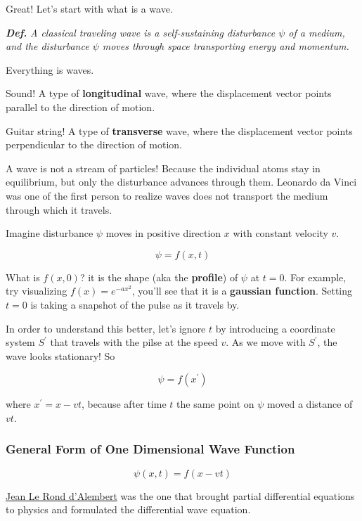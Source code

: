 \documentclass[
  letterpaper,
  DIV=11,
  numbers=noendperiod]{scrreprt}
\begin{document}
Great! Let's start with what is a wave.

\textbf{\emph{Def.}} \emph{A classical traveling wave is a
self-sustaining disturbance \(\psi\) of a medium, and the disturbance
\(\psi\) moves through space transporting energy and momentum.}

Everything is waves.

Sound! A type of \textbf{longitudinal} wave, where the displacement
vector points parallel to the direction of motion.

Guitar string! A type of \textbf{transverse} wave, where the
displacement vector points perpendicular to the direction of motion.

A wave is not a stream of particles! Because the individual atoms stay
in equilibrium, but only the disturbance advances through them. Leonardo
da Vinci was one of the first person to realize waves does not transport
the medium through which it travels.

Imagine disturbance \(\psi\) moves in positive direction \(x\) with
constant velocity \(v\).

\[\psi = f(x,t)\]

What is \(f(x,0)\)? it is the shape (aka the \textbf{profile}) of
\(\psi\) at \(t=0\). For example, try visualizing \(f(x) = e^{-ax^2}\),
you'll see that it is a \textbf{gaussian function}. Setting \(t=0\) is
taking a snapshot of the pulse as it travels by.

In order to understand this better, let's ignore \(t\) by introducing a
coordinate system \(S^{'}\) that travels with the pilse at the speed
\(v\). As we move with \(S^{'}\), the wave looks stationary! So

\[\psi = f \left( x^{'} \right)\]

where \(x^{'} = x - vt\), because after time \(t\) the same point on
\(\psi\) moved a distance of \(vt\).

\subsubsection*{General Form of One Dimensional Wave
Function}\label{general-form-of-one-dimensional-wave-function}

\[\psi(x,t) = f(x - vt)\]

\href{https://en.wikipedia.org/wiki/Jean_le_Rond_d\%27Alembert}{Jean Le
Rond d'Alembert} was the one that brought partial differential equations
to physics and formulated the differential wave equation.
\end{document}
